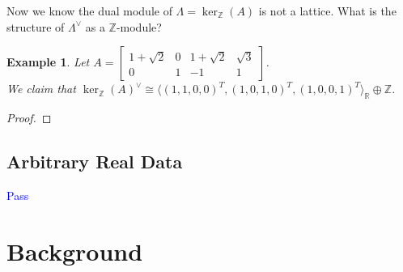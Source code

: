 \documentclass{article}
\newcommand{\Z}[0]{\mathbb{Z}}		%
\newcommand{\R}[0]{\mathbb{R}}		%
\newtheorem{ex}[thm]{Example}
\theoremstyle{definition}
\newtheorem{defn}[thm]{Definition}
\theoremstyle{remark}
\begin{document}
Now we know the dual module of $\Lambda = \ker_\Z(A)$ is not a lattice. What is the structure of $\Lambda^\vee$ as a $\Z$-module? 
\begin{ex}
Let $A = \begin{bmatrix}1+\sqrt{2} & 0 & 1+\sqrt{2} & \sqrt{3} \\ 0 & 1 & -1 &1\end{bmatrix}$. \\ We claim that $ \ker_\Z(A)^\vee \cong  \langle (1,1,0,0)^T,(1,0,1,0)^T,(1,0,0,1)^T\rangle_\R \oplus \Z$.
\end{ex}
\begin{proof}

\end{proof}
\subsection{Arbitrary Real Data}
\textcolor{blue}{Pass}
\section{Background}
\end{document}
